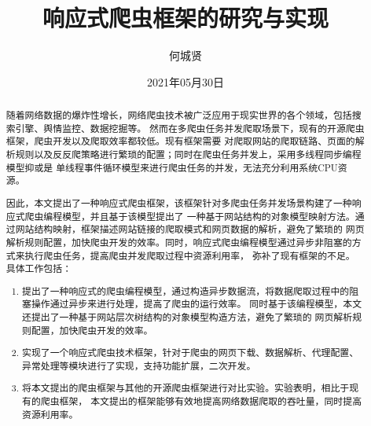 \documentclass[master]{njuthesis}
\title{响应式爬虫框架的研究与实现}
\author{何城贤}
\institute{南京大学}
\date{2021年05月30日}
\begin{document}

\makenlctitle
\maketitle
\makeenglishtitle


\frontmatter

\begin{abstract}
随着网络数据的爆炸性增长，网络爬虫技术被广泛应用于现实世界的各个领域，包括搜索引擎、舆情监控、数据挖掘等。
然而在多爬虫任务并发爬取场景下，现有的开源爬虫框架，爬虫开发以及爬取效率都较低。现有框架需要
对爬取网站的爬取链路、页面的解析规则以及反反爬策略进行繁琐的配置；同时在爬虫任务并发上，采用多线程同步编程模型抑或是
单线程事件循环模型来进行爬虫任务的并发，无法充分利用系统CPU资源。

因此，本文提出了一种响应式爬虫框架，该框架针对多爬虫任务并发场景构建了一种响应式爬虫编程模型，并且基于该模型提出了
一种基于网站结构的对象模型映射方法。通过网站结构映射，框架描述网站链接的爬取模式和网页数据的解析，避免了繁琐的
网页解析规则配置，加快爬虫开发的效率。同时，响应式爬虫编程模型通过异步非阻塞的方式来执行爬虫任务，提高爬虫并发爬取过程中资源利用率，
弥补了现有框架的不足。
具体工作包括：

\begin{enumerate}

  \item 提出了一种响应式的爬虫编程模型，通过构造异步数据流，将数据爬取过程中的阻塞操作通过异步来进行处理，提高了爬虫的运行效率。
  同时基于该编程模型，本文还提出了一种基于网站层次树结构的对象模型构造方法，避免了繁琐的
网页解析规则配置，加快爬虫开发的效率。

  \item 实现了一个响应式爬虫技术框架，针对于爬虫的网页下载、数据解析、代理配置、异常处理等模块进行了实现，支持功能扩展，二次开发。

  \item 将本文提出的爬虫框架与其他的开源爬虫框架进行对比实验。实验表明，相比于现有的爬虫框架，
  本文提出的框架能够有效地提高网络数据爬取的吞吐量，同时提高资源利用率。
\end{enumerate}

\end{abstract}
\end{document}
